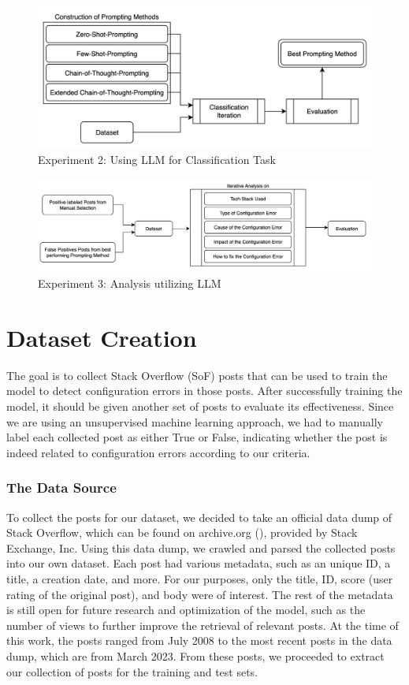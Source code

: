 \documentclass[english,bachelor]{swsLeipzig}
\begin{document}
\begin{figure}[h]
  \includegraphics[width=1\textwidth]{images/figure3.png}
  \caption{Experiment 2: Using LLM for Classification Task}
  \label{fig:figure43}
\end{figure}

\begin{figure}[h]
  \includegraphics[width=1\textwidth]{images/figure4.png}
  \caption{Experiment 3: Analysis utilizing LLM}
  \label{fig:figure44}
\end{figure}

\section{Dataset Creation}
The goal is to collect Stack Overflow (SoF) posts that can be used to train the model to detect configuration errors 
in those posts. After successfully training the model, it should be given another set of posts to evaluate its effectiveness. Since we are using an unsupervised machine learning approach, we had to manually label each collected post as either True or False, indicating whether the post is indeed related to configuration errors according to our criteria.

\subsubsection{The Data Source}
To collect the posts for our dataset, we decided to take an official data dump of Stack Overflow, which can be found 
on archive.org (\citet{stackexchange:2023}), provided by Stack Exchange, Inc. Using this data dump, we crawled and parsed the collected posts into our own dataset. Each post had various metadata, such as an unique ID, a title, a creation date, and more. For our purposes, only the title, ID, score (user rating of the original post), and body were of interest. The rest of the metadata is still open for future research and optimization of the model, such as the number of views to further improve the retrieval of relevant posts. At the time of this work, the posts ranged from July 2008 to the most recent posts in the data dump, which are from March 2023. From these posts, we proceeded to extract our collection of posts for the training and test sets.
\end{document}
